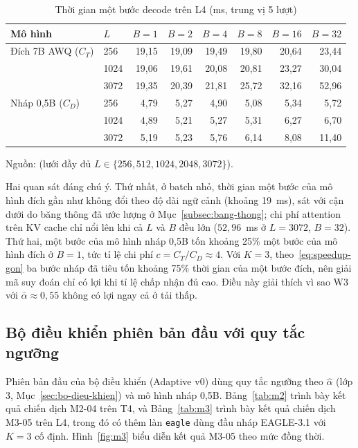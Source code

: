 \begin{table}[htbp]
\centering
\caption{Thời gian một bước decode trên L4 (ms, trung vị 5 lượt)}
\label{tab:m302}
\small
\begin{tabular}{@{}llrrrrrr@{}}
\toprule
\textbf{Mô hình} & \textbf{$L$} & \textbf{$B=1$} & \textbf{$B=2$} & \textbf{$B=4$} & \textbf{$B=8$} & \textbf{$B=16$} & \textbf{$B=32$} \\
\midrule
Đích 7B AWQ ($C_T$) & 256  & 19,15 & 19,09 & 19,49 & 19,80 & 20,64 & 23,44 \\
                    & 1024 & 19,06 & 19,61 & 20,08 & 20,81 & 23,27 & 30,04 \\
                    & 3072 & 19,35 & 20,39 & 21,81 & 25,72 & 32,16 & 52,96 \\
\midrule
Nháp 0,5B ($C_D$)   & 256  & 4,79 & 5,27 & 4,90 & 5,08 & 5,34 & 5,72 \\
                    & 1024 & 4,89 & 5,21 & 5,27 & 5,31 & 6,27 & 6,70 \\
                    & 3072 & 5,19 & 5,23 & 5,76 & 6,14 & 8,08 & 11,40 \\
\bottomrule
\end{tabular}

\vspace{2pt}
{\footnotesize Nguồn:  (lưới đầy đủ $L \in \{256, 512, 1024, 2048, 3072\}$).}
\end{table}

Hai quan sát đáng chú ý. Thứ nhất, ở batch nhỏ, thời gian một bước của mô hình đích gần như không đổi theo độ dài ngữ cảnh (khoảng 19~ms), sát với cận dưới do băng thông đã ước lượng ở Mục~\ref{subsec:bang-thong}; chi phí attention trên KV cache chỉ nổi lên khi cả $L$ và $B$ đều lớn ($52{,}96$~ms ở $L = 3072$, $B = 32$). Thứ hai, một bước của mô hình nháp 0,5B tốn khoảng 25\% một bước của mô hình đích ở $B = 1$, tức tỉ lệ chi phí $c = C_T / C_D \approx 4$. Với $K = 3$, theo~\eqref{eq:speedup-gon} ba bước nháp đã tiêu tốn khoảng 75\% thời gian của một bước đích, nên giải mã suy đoán chỉ có lợi khi tỉ lệ chấp nhận đủ cao. Điều này giải thích vì sao W3 với $\bar\alpha \approx 0{,}55$ không có lợi ngay cả ở tải thấp.

\subsection{Bộ điều khiển phiên bản đầu với quy tắc ngưỡng}
\label{subsec:kq-v0}

Phiên bản đầu của bộ điều khiển (Adaptive v0) dùng quy tắc ngưỡng theo $\hat\alpha$ (lớp 3, Mục~\ref{sec:bo-dieu-khien}) và mô hình nháp 0,5B. Bảng~\ref{tab:m2} trình bày kết quả chiến dịch M2-04 trên T4, và Bảng~\ref{tab:m3} trình bày kết quả chiến dịch M3-05 trên L4, trong đó có thêm làn \texttt{eagle} dùng đầu nháp EAGLE-3.1 với $K = 3$ cố định. Hình~\ref{fig:m3} biểu diễn kết quả M3-05 theo mức đồng thời.

